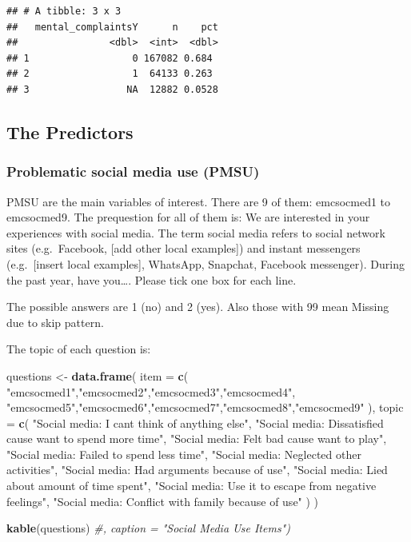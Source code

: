 \documentclass[
]{article}
\newenvironment{Shaded}{\begin{snugshade}}{\end{snugshade}}
\newcommand{\AttributeTok}[1]{\textcolor[rgb]{0.13,0.29,0.53}{#1}}
\newcommand{\CommentTok}[1]{\textcolor[rgb]{0.56,0.35,0.01}{\textit{#1}}}
\newcommand{\FunctionTok}[1]{\textcolor[rgb]{0.13,0.29,0.53}{\textbf{#1}}}
\newcommand{\NormalTok}[1]{#1}
\newcommand{\OtherTok}[1]{\textcolor[rgb]{0.56,0.35,0.01}{#1}}
\newcommand{\StringTok}[1]{\textcolor[rgb]{0.31,0.60,0.02}{#1}}
\begin{document}
\begin{verbatim}
## # A tibble: 3 x 3
##   mental_complaintsY      n    pct
##                <dbl>  <int>  <dbl>
## 1                  0 167082 0.684 
## 2                  1  64133 0.263 
## 3                 NA  12882 0.0528
\end{verbatim}

\subsection{The Predictors}\label{the-predictors}

\subsubsection{Problematic social media use
(PMSU)}\label{problematic-social-media-use-pmsu}

PMSU are the main variables of interest. There are 9 of them: emcsocmed1
to emcsocmed9. The prequestion for all of them is: We are interested in
your experiences with social media. The term social media refers to
social network sites (e.g.~Facebook, {[}add other local examples{]}) and
instant messengers (e.g.~{[}insert local examples{]}, WhatsApp,
Snapchat, Facebook messenger). During the past year, have you\ldots.
Please tick one box for each line.

The possible answers are 1 (no) and 2 (yes). Also those with 99 mean
Missing due to skip pattern.

The topic of each question is:

\begin{Shaded}
\begin{Highlighting}[]
\NormalTok{questions }\OtherTok{\textless{}{-}} \FunctionTok{data.frame}\NormalTok{(}
  \AttributeTok{item =} \FunctionTok{c}\NormalTok{(}
    \StringTok{"emcsocmed1"}\NormalTok{,}\StringTok{"emcsocmed2"}\NormalTok{,}\StringTok{"emcsocmed3"}\NormalTok{,}\StringTok{"emcsocmed4"}\NormalTok{,}
    \StringTok{"emcsocmed5"}\NormalTok{,}\StringTok{"emcsocmed6"}\NormalTok{,}\StringTok{"emcsocmed7"}\NormalTok{,}\StringTok{"emcsocmed8"}\NormalTok{,}\StringTok{"emcsocmed9"}
\NormalTok{  ),}
  \AttributeTok{topic =} \FunctionTok{c}\NormalTok{(}
    \StringTok{"Social media: I can\textquotesingle{}t think of anything else"}\NormalTok{,}
    \StringTok{"Social media: Dissatisfied cause want to spend more time"}\NormalTok{,}
    \StringTok{"Social media: Felt bad cause want to play"}\NormalTok{,}
    \StringTok{"Social media: Failed to spend less time"}\NormalTok{,}
    \StringTok{"Social media: Neglected other activities"}\NormalTok{,}
    \StringTok{"Social media: Had arguments because of use"}\NormalTok{,}
    \StringTok{"Social media: Lied about amount of time spent"}\NormalTok{,}
    \StringTok{"Social media: Use it to escape from negative feelings"}\NormalTok{,}
    \StringTok{"Social media: Conflict with family because of use"}
\NormalTok{  )}
\NormalTok{)}

\FunctionTok{kable}\NormalTok{(questions) }\CommentTok{\#, caption = "Social Media Use Items")}
\end{Highlighting}
\end{Shaded}
\end{document}
